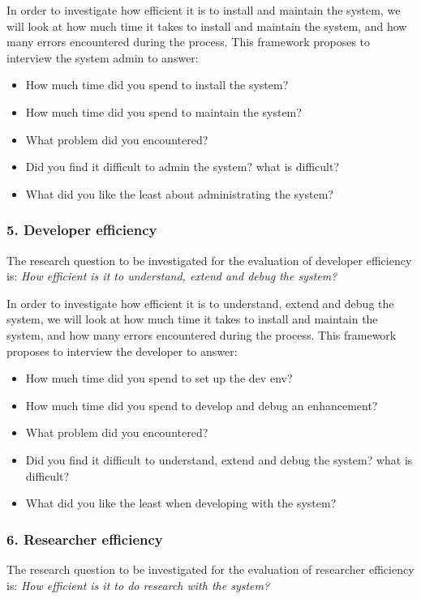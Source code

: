 \documentclass{sigchi}
\begin{document}
In order to investigate how efficient it is to install and maintain the system, we will look at how much time it takes to install and maintain the system, and how many errors encountered during the process. This framework proposes to interview the system admin to answer:
\begin{itemize}
\item How much time did you spend to install the system?
\item How much time did you spend to maintain the system?
\item What problem did you encountered?
\item Did you find it difficult to admin the system? what is difficult?
\item What did you like the least about administrating the system?
\end{itemize}

\subsubsection{5. Developer efficiency}
The research question to be investigated for the evaluation of developer efficiency is: \emph{How efficient is it to understand, extend and debug the system?}

In order to investigate how efficient it is to understand, extend and debug the system, we will look at how much time it takes to install and maintain the system, and how many errors encountered during the process. This framework proposes to interview the developer to answer:
\begin{itemize}
\item How much time did you spend to set up the dev env?
\item How much time did you spend to develop and debug an enhancement?
\item What problem did you encountered?
\item Did you find it difficult to understand, extend and debug the system? what is difficult?
\item What did you like the least when developing with the system?
\end{itemize}

\subsubsection{6. Researcher efficiency}
The research question to be investigated for the evaluation of researcher efficiency is: \emph{How efficient is it to do research with the system?}
\end{document}
